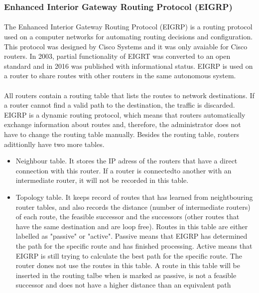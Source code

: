 \subsubsection*{Enhanced Interior Gateway Routing Protocol (EIGRP)\cite{EIGRP}}
\paragraph{}The Enhanced Interior Gateway Routing Protocol (EIGRP) is a routing protocol used on a computer networks for automating routing decisions and configuration. This protocol was designed by Cisco Systems and it was only avaiable for Cisco routers. In 2003, partial functionality of EIGRT was converted to an open standard and in 2016 was published with informational status. EIGRP is used on a router to share routes with other routers in the same autonomous system.
\paragraph{}All routers contain a routing table that lists the routes to network destinations. If a router cannot find a valid path to the destination, the traffic is discarded. EIGRP is a dynamic routing protocol, which means that routers automatically exchange information about routes and, therefore, the administrator does not have to change the routing table manually. Besides the routing table, routers adittionlly have two more tables.
\begin{itemize}
\item Neighbour table. It stores the IP adress of the routers that have a direct connection with this router. If a router is connectedto another with an intermediate router, it will not be recorded in this table.
\item Topology table. It keeps record of routes that has learned from neightbouring router tables, and also records the distance (number of intermediate routers) of each route, the feasible successor and the successors (other routes that have the same destination and are loop free). Routes in this table are either labelled as "passive" or "active". Passive means that EIGRP  has determined the path for the specific route and has finished processing. Active means that EIGRP is still trying to calculate the best path for the specific route. The router dones not use the routes in this table. A route in this table will be inserted in the routing talbe when is marked as passive, is not a feasible successor and does not have a higher distance than an equivalent path
\end{itemize}
